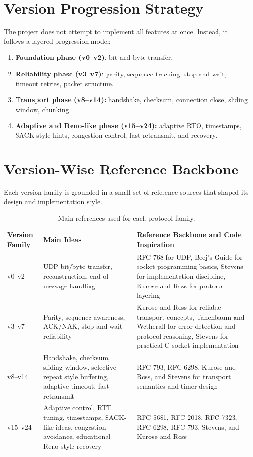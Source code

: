 \section{Version Progression Strategy}
The project does not attempt to implement all features at once. Instead, it
follows a layered progression model:

\begin{enumerate}
	\item \textbf{Foundation phase (v0--v2):} bit and byte transfer.
	\item \textbf{Reliability phase (v3--v7):} parity, sequence tracking,
	stop-and-wait, timeout retries, packet structure.
	\item \textbf{Transport phase (v8--v14):} handshake, checksum,
	connection close, sliding window, chunking.
	\item \textbf{Adaptive and Reno-like phase (v15--v24):} adaptive RTO,
	timestamps, SACK-style hints, congestion control, fast retransmit, and
	recovery.
\end{enumerate}

\section{Version-Wise Reference Backbone}
Each version family is grounded in a small set of reference sources that shaped
its design and implementation style.

\begin{table}[h!]
\centering
\renewcommand{\arraystretch}{1.22}
\begin{tabular}{|p{2.4cm}|p{4.0cm}|p{7.7cm}|}
\hline
\textbf{Version Family} & \textbf{Main Ideas} & \textbf{Reference Backbone and Code Inspiration} \\
\hline
v0--v2 & UDP bit/byte transfer, reconstruction, end-of-message handling & RFC 768 for UDP, Beej's Guide for socket programming basics, Stevens for implementation discipline, Kurose and Ross for protocol layering \cite{rfc768,beej_guide,stevens_tcpip,kurose_ross} \\
\hline
v3--v7 & Parity, sequence awareness, ACK/NAK, stop-and-wait reliability & Kurose and Ross for reliable transport concepts, Tanenbaum and Wetherall for error detection and protocol reasoning, Stevens for practical C socket implementation \cite{kurose_ross,tanenbaum_wetherall,stevens_tcpip} \\
\hline
v8--v14 & Handshake, checksum, sliding window, selective-repeat style buffering, adaptive timeout, fast retransmit & RFC 793, RFC 6298, Kurose and Ross, and Stevens for transport semantics and timer design \cite{rfc793,rfc6298,kurose_ross,stevens_tcpip} \\
\hline
v15--v24 & Adaptive control, RTT tuning, timestamps, SACK-like ideas, congestion avoidance, educational Reno-style recovery & RFC 5681, RFC 2018, RFC 7323, RFC 6298, RFC 793, Stevens, and Kurose and Ross \cite{rfc5681,rfc2018,rfc7323,rfc6298,rfc793,stevens_tcpip,kurose_ross} \\
\hline
\end{tabular}
\caption{Main references used for each protocol family.}
\label{tab:reference-backbone}
\end{table}

